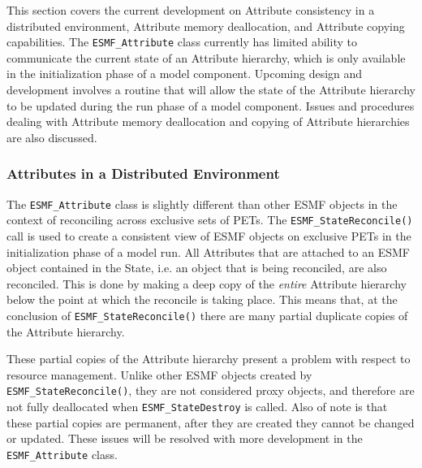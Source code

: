 %

This section covers the current development on Attribute consistency in a distributed environment, Attribute memory deallocation, and Attribute copying capabilities.  The {\tt ESMF\_Attribute} class currently has limited ability to communicate the current state of an Attribute hierarchy, which is only available in the initialization phase of a model component.  Upcoming design and development involves a routine that will allow the state of the Attribute hierarchy to be updated during the run phase of a model component.  Issues and procedures dealing with Attribute memory deallocation and copying of Attribute hierarchies are also discussed. 

\subsubsection{Attributes in a Distributed Environment} 
\label{sec:Att:Dist}

The  {\tt ESMF\_Attribute} class is slightly different than other ESMF objects in the context of reconciling across exclusive sets of PETs.  The {\tt ESMF\_StateReconcile()} call is used to create a consistent view of ESMF objects on exclusive PETs in the initialization phase of a model run.  All Attributes that are attached to an ESMF object contained in the State, i.e. an object that is being reconciled, are also reconciled.  This is done by making a deep copy of the {\it entire} Attribute hierarchy below the point at which the reconcile is taking place.  This means that, at the conclusion of {\tt ESMF\_StateReconcile()} there are many partial duplicate copies of the Attribute hierarchy.

These partial copies of the Attribute hierarchy present a problem with respect to resource management.  Unlike other ESMF objects created by {\tt ESMF\_StateReconcile()}, they are not considered proxy objects, and therefore are not fully deallocated when {\tt ESMF\_StateDestroy} is called.  Also of note is that these partial copies are permanent, after they are created they cannot be changed or updated.  These issues will be resolved with more development in the {\tt ESMF\_Attribute} class.

